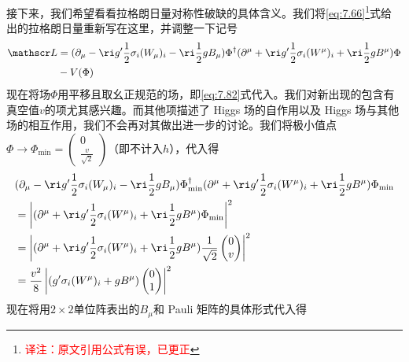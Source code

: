 接下来，我们希望看看拉格朗日量对称性破缺的具体含义。我们将\ref{eq:7.66}\footnote{\textcolor{red}{译注：原文引用公式有误，已更正}}式给出的拉格朗日量重新写在这里，并调整一下记号
\begin{equation}
\begin{aligned}
{\mathscr L} &= (\partial_\mu-\ri g'\frac{1}{2}\sigma_i(W_\mu)_i-\ri\frac{1}{2}gB_\mu)\Phi^\dag(\partial^\mu+\ri g'\frac{1}{2}\sigma_i(W^\mu)_i+\ri\frac{1}{2}gB^\mu)\Phi \\
 & -V(\Phi)
\end{aligned}
\end{equation}
现在将场$\Phi$用平移且取幺正规范的场，即\ref{eq:7.82}式代入。我们对新出现的包含有真空值$v$的项尤其感兴趣。而其他项描述了 Higgs 场的自作用以及 Higgs 场与其他场的相互作用，我们不会再对其做出进一步的讨论。我们将极小值点$\Phi\rightarrow\Phi_{\min}= \begin{pmatrix}
0 \\\frac{v}{\sqrt{2}}
\end{pmatrix}$（即不计入$h$），代入得
\[
\begin{aligned}
& (\partial_\mu-\ri g'\frac{1}{2}\sigma_i(W_\mu)_i-\ri\frac{1}{2}gB_\mu)\Phi^\dag_{\min}(\partial^\mu+\ri g'\frac{1}{2}\sigma_i(W^\mu)_i+\ri\frac{1}{2}gB^\mu)\Phi_{\min} \\
& = \left|(\partial^\mu+\ri g'\frac{1}{2}\sigma_i(W^\mu)_i+\ri\frac{1}{2}gB^\mu)\Phi_{\min}\right|^2 \\
& = \left|(\partial^\mu+\ri g'\frac{1}{2}\sigma_i(W^\mu)_i+\ri\frac{1}{2}gB^\mu)\frac{1}{\sqrt{2}}\begin{pmatrix}
0 \\ v
\end{pmatrix}\right|^2 \\
& = \frac{v^2}{8} \left|( g'\sigma_i(W^\mu)_i+gB^\mu)\begin{pmatrix} 0 \\ 1 \end{pmatrix}\right|^2
\end{aligned}
\]
现在将用$2\times 2$单位阵表出的$B_\mu$和 Pauli 矩阵的具体形式代入得
